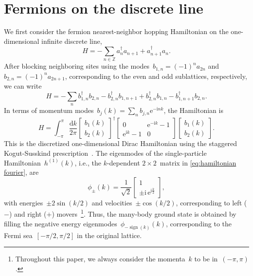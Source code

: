 \documentclass[aps,pra,reprint,superscriptaddress,floatfix,amsmath,amssymb,amsfonts]{revtex4-1}
\DeclareMathOperator{\sign}{sign}
\newcommand*{\Z}{\mathbb Z}
\newcommand*{\rmi}{\mathrm{i}}
\newcommand*{\rme}{\mathrm{e}}
\newcommand*{\rmd}{\mathrm{d}}
\begin{document}
\section{Fermions on the discrete line}\label{sec:1d}
We first consider the fermion nearest-neighbor hopping Hamiltonian on the one-dimensional infinite discrete line,
\begin{equation}\label{eq:hamiltonian 1d}
H = - \sum_{n \in \Z} a_n^\dagger a_{n+1} + a_{n+1}^\dagger a_n.
\end{equation}
After blocking neighboring sites using the modes~$b_{1,n} = (-1)^n a_{2n}$ and~$b_{2,n} = (-1)^n a_{2n+1}$, corresponding to the even and odd sublattices, respectively, we can write
\begin{equation*}
H = -\sum_{n} b_{1,n}^\dagger b_{2,n} - b_{2,n}^\dagger b_{1,n+1} + b_{2,n}^\dagger b_{1,n} - b_{1,n+1}^\dagger b_{2,n}.
\end{equation*}
In terms of momentum modes~$b_j(k) = \sum_n b_{j,n} \rme^{-\rmi n k}$, the Hamiltonian is
\begin{equation}\label{eq:hamiltonian fourier}
   H = \int_{-\pi}^{\pi} \frac{\rmd k}{2 \pi} \begin{bmatrix} b_{1}(k)\\  b_{2}(k)\end{bmatrix}^\dagger\!\!\begin{bmatrix} 0 & \rme^{-\rmi k}-1\\ \rme^{\rmi k}-1 & 0 \end{bmatrix} \! \begin{bmatrix} b_{1}(k)\\  b_{2}(k)\end{bmatrix}.
\end{equation}
This is the discretized one-dimensional Dirac Hamiltonian using the staggered Kogut-Susskind prescription~\cite{kogut1975hamiltonian}.
The eigenmodes of the single-particle Hamiltonian~$h^{(1)}(k)$, i.e., the $k$-dependent $2 \times 2$~matrix in \cref{eq:hamiltonian fourier}, are
\begin{equation*}
  \phi_{\pm} (k) = \frac1{\sqrt 2} \begin{bmatrix} 1 \\ \pm \rmi \,\rme^{\rmi \frac{k}{2}}\end{bmatrix},
\end{equation*}
with energies~$\pm 2\sin(k/2)$ and velocities~$\pm \cos(k/2)$, corresponding to left ($-$) and right ($+$) movers~\footnote{Throughout this paper, we always consider the momenta~$k$ to be in~$(-\pi,\pi)$.}.
Thus, the many-body ground state is obtained by filling the negative energy eigenmodes~$\phi_{-\sign(k)}(k)$, corresponding to the Fermi sea~$[-\pi/2,\pi/2]$ in the original lattice.
\end{document}
